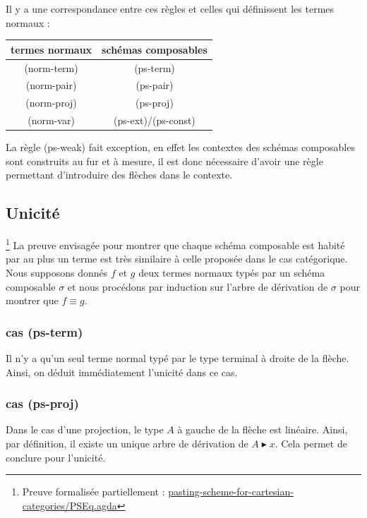 \documentclass[conference]{IEEEtran}
\begin{document}
	Il y a une correspondance entre ces règles et celles qui définissent les termes normaux : \\
	
	\begin{center}
	\begin{tabular}{c||c}
		\hline
		\bfseries{termes normaux}	& \bfseries{schémas composables} \\
		\hline
			(norm-term) & (ps-term) \\
		\hline
			(norm-pair) & (ps-pair) \\
		\hline
			(norm-proj) & (ps-proj) \\
		\hline
			(norm-var)  & (ps-ext)/(ps-const)
	\end{tabular}
	\end{center}
	\vspace{10pt}
	
	La règle (ps-weak) fait exception, en effet les contextes des schémas composables sont construits au fur et à mesure, il est donc nécessaire d'avoir une règle permettant d'introduire des flèches dans le contexte.
	
	\subsection{Unicité}
	\footnote{Preuve formalisée partiellement : \href{https://github.com/ehouget/L3-ENS-Internship/blob/main/pasting-scheme-for-cartesian-categories/PSEq.agda}{pasting-scheme-for-cartesian-categories/PSEq.agda} }
	La preuve envisagée pour montrer que chaque schéma composable est habité par au plus un terme est très similaire à celle proposée dans le cas catégorique. Nous supposons donnés $f$ et $g$ deux termes normaux typés par un schéma composable $\sigma$ et nous procédons par induction sur l'arbre de dérivation de $\sigma$ pour montrer que $f \equiv g$.
	
	\subsubsection{cas (ps-term)}
	Il n'y a qu'un seul terme normal typé par le type terminal à droite de la flèche. Ainsi, on déduit immédiatement l'unicité dans ce cas.
	
	\subsubsection{cas (ps-proj)}
	Dans le cas d'une projection, le type $A$ à gauche de la flèche est linéaire. Ainsi, par définition, il existe un unique arbre de dérivation de $A \blacktriangleright x$. Cela permet de conclure pour l'unicité.
	
\end{document}

